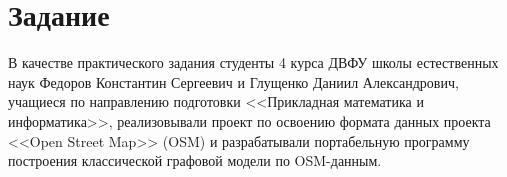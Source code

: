 \chapter*{Задание}
\noindent\indent В качестве практического задания студенты 4 курса ДВФУ
школы естественных наук Федоров Константин Сергеевич и Глущенко Даниил
Александрович, учащиеся по направлению подготовки <<Прикладная математика
и информатика>>, реализовывали проект по освоению формата данных проекта
<<Open Street Map>> (OSM) и разрабатывали портабельную программу построения
классической графовой модели по OSM-данным.
